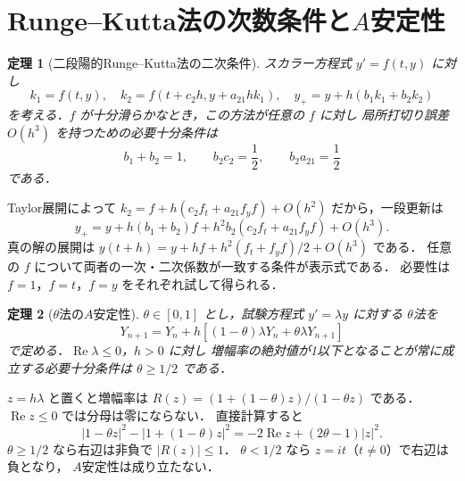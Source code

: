 \documentclass[a5paper,10pt,onecolumn]{jsarticle}
\makeatletter
\theoremstyle{mathnotetheorem}
\newtheorem{theorem}{定理}[section]
\renewcommand{\proofname}{証明}
\renewenvironment{proof}[1][\proofname]{%
  \par\pushQED{\qed}\normalfont\topsep4\p@\@plus2\p@\relax
  \trivlist\item[\hskip\labelsep\bfseries #1]\ignorespaces
}{\popQED\endtrivlist\@endpefalse}
\makeatother
\begin{document}
\section{Runge--Kutta法の次数条件と$A$安定性}
\begin{theorem}[二段陽的Runge--Kutta法の二次条件]
スカラー方程式 $y'=f(t,y)$ に対し
\[
 k_1=f(t,y),\quad k_2=f(t+c_2h,y+a_{21}hk_1),\quad
 y_+=y+h(b_1k_1+b_2k_2)
\]
を考える．$f$ が十分滑らかなとき，この方法が任意の $f$ に対し
局所打切り誤差 $O(h^3)$ を持つための必要十分条件は
\[
 b_1+b_2=1,\qquad b_2c_2=\frac12,
 \qquad b_2a_{21}=\frac12
\]
である．
\end{theorem}
\begin{proof}
Taylor展開によって
$k_2=f+h(c_2f_t+a_{21}f_yf)+O(h^2)$ だから，一段更新は
\[
 y_+=y+h(b_1+b_2)f
 +h^2b_2(c_2f_t+a_{21}f_yf)+O(h^3).
\]
真の解の展開は
$y(t+h)=y+hf+h^2(f_t+f_yf)/2+O(h^3)$ である．
任意の $f$ について両者の一次・二次係数が一致する条件が表示式である．
必要性は $f=1$，$f=t$，$f=y$ をそれぞれ試して得られる．
\end{proof}
\begin{theorem}[$\theta$法の$A$安定性]
$\theta\in[0,1]$ とし，試験方程式 $y'=\lambda y$ に対する
$\theta$法を
\[
 Y_{n+1}=Y_n+h[(1-\theta)\lambda Y_n+
 \theta\lambda Y_{n+1}]
\]
で定める．$\operatorname{Re}\lambda\le0$，$h>0$ に対し
増幅率の絶対値が1以下となることが常に成立する必要十分条件は
$\theta\ge1/2$ である．
\end{theorem}
\begin{proof}
$z=h\lambda$ と置くと増幅率は
$R(z)=(1+(1-\theta)z)/(1-\theta z)$ である．
$\operatorname{Re}z\le0$ では分母は零にならない．
直接計算すると
\[
 |1-\theta z|^2-|1+(1-\theta)z|^2
 =-2\operatorname{Re}z+(2\theta-1)|z|^2.
\]
$\theta\ge1/2$ なら右辺は非負で $|R(z)|\le1$．
$\theta<1/2$ なら $z=it$（$t\ne0$）で右辺は負となり，
$A$安定性は成り立たない．
\end{proof}
\end{document}
